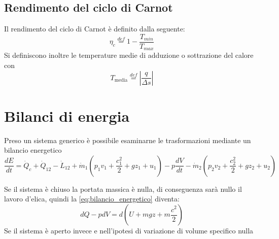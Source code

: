 \documentclass[a4paper,12pt]{article}
\begin{document}
\subsection{Rendimento del ciclo di Carnot}
\label{subsec:rendimento_carnot}
Il rendimento del ciclo di Carnot è definito dalla seguente:
\begin{equation}
    \eta_c \stackrel{def}{=} 1 - \frac{T_{min}}{T_{max}}
\end{equation}
Si definiscono inoltre le temperature medie di adduzione o sottrazione del calore con
\begin{equation}
    T_{\text{media}} \stackrel{def}{=} \left|\frac{q}{\Delta s}\right|
\end{equation}

\section{Bilanci di energia}
\label{sec:bilanci_energia}
Preso un sistema generico è possibile esaminarne le trasformazioni mediante un bilancio
energetico
\begin{equation}
    \label{eq:bilancio_energetico}
    \frac{dE}{dt} = \dot{Q}_c + \dot{Q}_{12} - \dot{L}_{12} + \dot{m}_1
    (p_1v_1 + \frac{c^2_1}{2} + gz_1 + u_1) -p\frac{dV}{dt} - \dot{m}_2
    (p_2v_2 + \frac{c^2_2}{2} + gz_2 + u_2)
\end{equation}

Se il sistema è chiuso la portata massica è nulla, di conseguenza sarà nullo il lavoro
d'elica, quindi la \eqref{eq:bilancio_energetico} diventa:
\begin{equation}
    \label{eq:I_principio_gen_chiusi}
    dQ - pdV = d\left(U+mgz+m\frac{c^2}{2}\right)
\end{equation}
Se il sistema è aperto invece e nell'ipotesi di variazione di volume specifico nulla
\end{document}
